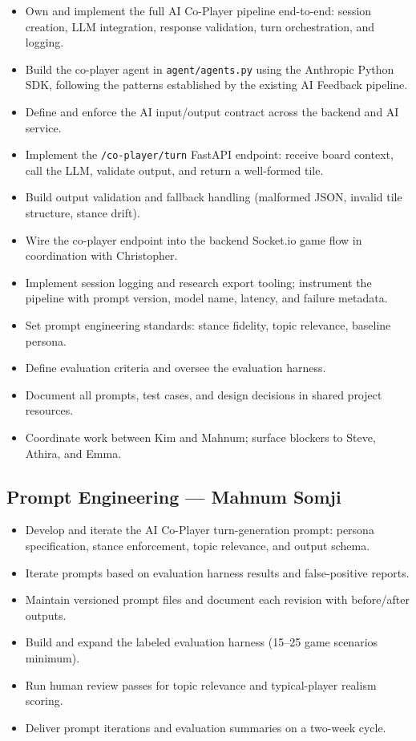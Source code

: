 \documentclass[11pt]{article}
\begin{document}
\begin{itemize}
  \item Own and implement the full AI Co-Player pipeline end-to-end: session creation,
        LLM integration, response validation, turn orchestration, and logging.
  \item Build the co-player agent in \texttt{agent/agents.py} using the Anthropic Python SDK,
        following the patterns established by the existing AI Feedback pipeline.
  \item Define and enforce the AI input/output contract across the backend and AI service.
  \item Implement the \texttt{/co-player/turn} FastAPI endpoint: receive board context, call
        the LLM, validate output, and return a well-formed tile.
  \item Build output validation and fallback handling (malformed JSON, invalid tile structure,
        stance drift).
  \item Wire the co-player endpoint into the backend Socket.io game flow in coordination
        with Christopher.
  \item Implement session logging and research export tooling; instrument the pipeline with
        prompt version, model name, latency, and failure metadata.
  \item Set prompt engineering standards: stance fidelity, topic relevance, baseline persona.
  \item Define evaluation criteria and oversee the evaluation harness.
  \item Document all prompts, test cases, and design decisions in shared project resources.
  \item Coordinate work between Kim and Mahnum; surface blockers to Steve, Athira, and Emma.
\end{itemize}

\subsection{Prompt Engineering --- Mahnum Somji}

\begin{itemize}
  \item Develop and iterate the AI Co-Player turn-generation prompt: persona specification,
        stance enforcement, topic relevance, and output schema.
  \item Iterate prompts based on evaluation harness results and false-positive reports.
  \item Maintain versioned prompt files and document each revision with before/after outputs.
  \item Build and expand the labeled evaluation harness (15--25 game scenarios minimum).
  \item Run human review passes for topic relevance and typical-player realism scoring.
  \item Deliver prompt iterations and evaluation summaries on a two-week cycle.
\end{itemize}
\end{document}
